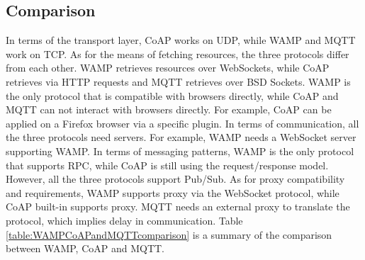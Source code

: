 \subsection{Comparison}
In terms of the transport layer, CoAP works on UDP, while WAMP and MQTT work on TCP. As for the means of fetching resources, the three protocols differ from each other. WAMP retrieves resources over WebSockets, while CoAP retrieves via HTTP requests and MQTT retrieves over BSD Sockets. WAMP is the only protocol that is compatible with browsers directly, while CoAP and MQTT can not interact with browsers directly. For example, CoAP can be applied on a Firefox browser via a specific plugin. In terms of communication, all the three protocols need servers. For example, WAMP needs a WebSocket server supporting WAMP. In terms of messaging patterns, WAMP is the only protocol that supports RPC, while CoAP is still using the request/response model. However, all the three protocols support Pub/Sub. As for proxy compatibility and requirements, WAMP supports proxy via the WebSocket protocol, while CoAP built-in supports proxy. MQTT needs an external proxy to translate the protocol, which implies delay in communication. Table \ref{table:WAMPCoAPandMQTTcomparison} is a summary of the comparison between WAMP, CoAP and MQTT.

